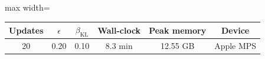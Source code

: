 \begin{adjustbox}{max width=\linewidth}
\begin{tabular}{cccccc}
\toprule
Updates & $\epsilon$ & $\beta_{\mathrm{KL}}$ & Wall-clock & Peak memory & Device \\
\midrule
20 & 0.20 & 0.10 & 8.3 min & 12.55 GB & Apple MPS \\
\bottomrule
\end{tabular}
\end{adjustbox}
